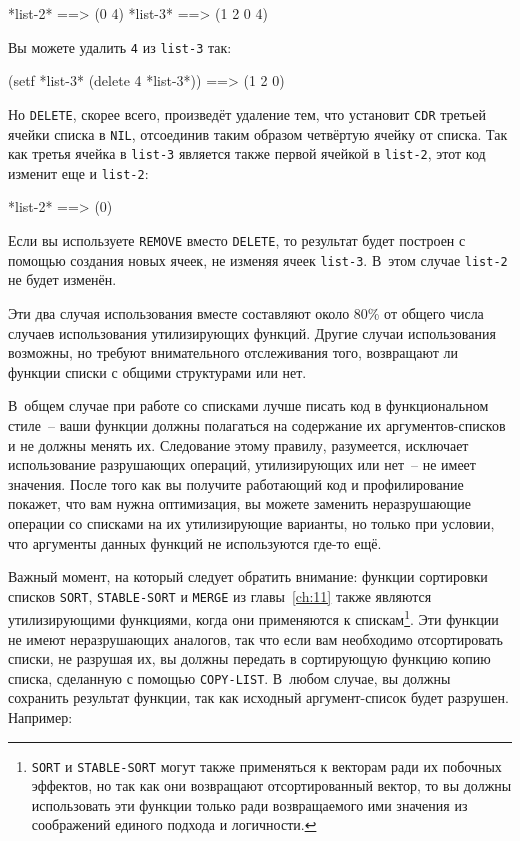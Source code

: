 \begin{myverb}
*list-2* ==> (0 4)
*list-3* ==> (1 2 0 4)
\end{myverb}

Вы можете удалить \lstinline{4} из \lstinline{list-3} так:

\begin{myverb}
(setf *list-3* (delete 4 *list-3*)) ==> (1 2 0)
\end{myverb}

Но \lstinline{DELETE}, скорее всего, произведёт удаление тем, что установит \lstinline{CDR} третьей
ячейки списка в \lstinline{NIL}, отсоединив таким образом четвёртую ячейку от
списка. Так как третья ячейка в \lstinline{list-3} является также первой ячейкой в \lstinline{list-2},
этот код изменит еще и \lstinline{list-2}:

\begin{myverb}
*list-2* ==> (0)
\end{myverb}

Если вы используете \lstinline{REMOVE} вместо \lstinline{DELETE}, то результат будет построен с
помощью создания новых ячеек, не изменяя ячеек \lstinline{list-3}. В~этом случае \lstinline{list-2}
не будет изменён.

Эти два случая использования вместе составляют около 80\% от общего числа случаев
использования утилизирующих функций. Другие случаи использования возможны, но требуют
внимательного отслеживания того, возвращают ли функции списки с общими структурами или нет.

В~общем случае при работе со списками лучше писать код в функциональном стиле~-- ваши
функции должны полагаться на содержание их аргументов-списков и не должны менять
их. Следование этому правилу, разумеется, исключает использование разрушающих операций,
утилизирующих или нет~-- не имеет значения. После того как вы получите работающий код и
профилирование покажет, что вам нужна оптимизация, вы можете заменить неразрушающие
операции со списками на их утилизирующие варианты, но только при условии, что аргументы
данных функций не используются где-то ещё.

Важный момент, на который следует обратить внимание: функции сортировки списков
\lstinline{SORT}, \lstinline{STABLE-SORT} и \lstinline{MERGE} из главы~\ref{ch:11} также являются
утилизирующими функциями, когда они применяются к спискам\footnote{\lstinline{SORT} и
  \lstinline{STABLE-SORT} могут также применяться к векторам ради их побочных эффектов, но
  так как они возвращают отсортированный вектор, то вы должны использовать эти функции только
  ради возвращаемого ими значения из соображений единого подхода и логичности.}. Эти
функции не имеют неразрушающих аналогов, так что если вам необходимо отсортировать списки,
не разрушая их, вы должны передать в сортирующую функцию копию списка, сделанную с помощью
\lstinline{COPY-LIST}. В~любом случае, вы должны сохранить результат функции, так как исходный
аргумент-список будет разрушен. Например:

